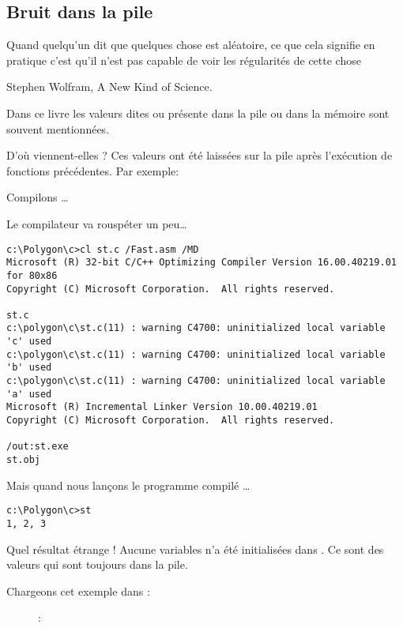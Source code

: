 \subsection{Bruit dans la pile}
\label{bruit_dans_la_pile}

\epigraph{Quand quelqu'un dit que quelques chose est aléatoire,
  ce que cela signifie en pratique c'est qu'il n'est pas capable de
  voir les régularités de cette chose}{Stephen Wolfram, A New Kind of Science.}

Dans ce livre les valeurs dites  ou  présente dans la pile ou dans la mémoire sont souvent mentionnées.

D'où viennent-elles ?
Ces valeurs ont été laissées sur la pile après l'exécution de fonctions précédentes.
Par exemple: 



Compilons \dots



Le compilateur va rouspéter un peu\dots 

\begin{lstlisting}
c:\Polygon\c>cl st.c /Fast.asm /MD
Microsoft (R) 32-bit C/C++ Optimizing Compiler Version 16.00.40219.01 for 80x86
Copyright (C) Microsoft Corporation.  All rights reserved.

st.c
c:\polygon\c\st.c(11) : warning C4700: uninitialized local variable 'c' used
c:\polygon\c\st.c(11) : warning C4700: uninitialized local variable 'b' used
c:\polygon\c\st.c(11) : warning C4700: uninitialized local variable 'a' used
Microsoft (R) Incremental Linker Version 10.00.40219.01
Copyright (C) Microsoft Corporation.  All rights reserved.

/out:st.exe
st.obj
\end{lstlisting}

Mais quand nous lançons le programme compilé \dots

\begin{lstlisting}
c:\Polygon\c>st
1, 2, 3
\end{lstlisting}

Quel résultat étrange ! Aucune variables n'a été initialisées dans .
Ce sont des valeurs  qui sont toujours dans la pile.

\clearpage
Chargeons cet exemple dans \olly:

\begin{figure}[H]
\centering
{}
\caption{\olly: }
\label{fig:stack_noise_olly1}
\end{figure}

